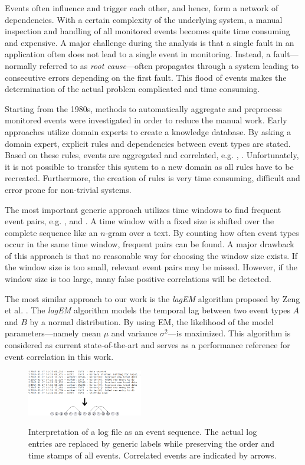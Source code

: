 \documentclass[conference]{IEEEtran}
\theoremstyle{examplestyle}
\begin{document}
Events often influence and trigger each other, and hence, form a network of dependencies. With a certain complexity of the underlying system, a manual inspection and handling of all monitored events becomes quite time consuming and expensive. A major challenge during the analysis is that a single fault in an application often does not lead to a single event in monitoring. Instead, a fault---normally referred to as \textit{root cause}---often propagates through a system leading to consecutive errors depending on the first fault. This flood of events makes the determination of the actual problem complicated and time consuming.

Starting from the 1980s, methods to automatically aggregate and preprocess monitored events were investigated in order to reduce the manual work. Early approaches utilize domain experts to create a knowledge database. By asking a domain expert, explicit rules and dependencies between event types are stated. Based on these rules, events are aggregated and correlated, e.g. \cite{Houck1995}, \cite{Kettschau2002}. Unfortunately, it is not possible to transfer this system to a new domain as all rules have to be recreated. Furthermore, the creation of rules is very time consuming, difficult and error prone for non-trivial systems.

The most important generic approach utilizes time windows to find frequent event pairs, e.g. \cite{Jakobson1993}, \cite{Mannila1997} and \cite{Bouandas2007}. A time window with a fixed size is shifted over the complete sequence like an \(n\)-gram over a text. By counting how often event types occur in the same time window, frequent pairs can be found. A major drawback of this approach is that no reasonable way for choosing the window size exists. If the window size is too small, relevant event pairs may be missed. However, if the window size is too large, many false positive correlations will be detected.


The most similar approach to our work is the \textit{lagEM} algorithm proposed by Zeng et al. \cite{Zeng2015}. The \textit{lagEM} algorithm models the temporal lag between two event types \(A\) and \(B\) by a normal distribution. By using \ac{EM}, the likelihood of the model parameters---namely mean \(\mu\) and variance \(\sigma^2\)---is maximized. This algorithm is considered as current state-of-the-art and serves as a performance reference for event correlation in this work.

\begin{figure}[!tb]
	\centering
	{
	\includegraphics[width=0.45\textwidth]{images/overview.png}}
	\caption{Interpretation of a log file as an event sequence. The actual log entries are replaced by generic labels while preserving the order and time stamps of all events. Correlated events are indicated by arrows.}
	\label{fig:logToSequence}
\end{figure}
\end{document}
